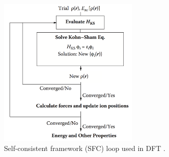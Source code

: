 \documentclass[3p,review,12pt]{elsarticle}
\begin{document}
\begin{figure}[h]
	\includegraphics[width=0.6\textwidth]{scf}
	\centering
	\caption{Self-consistent framework (SFC) loop used in DFT \cite{Lee2012}.} 
\end{figure}
\end{document}
